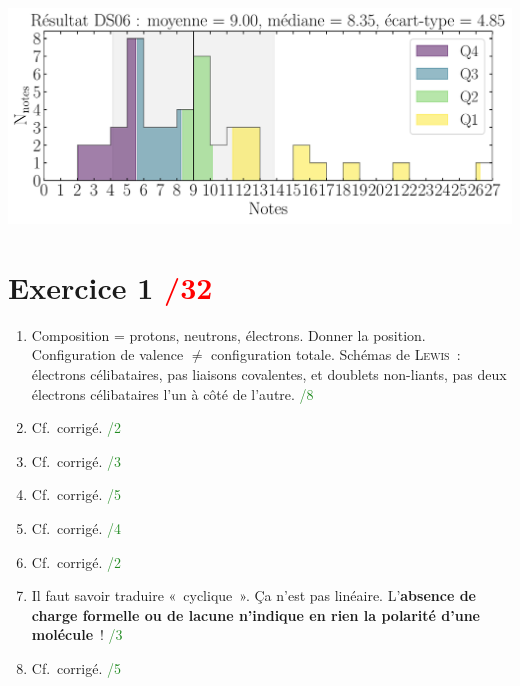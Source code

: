 \documentclass[a4paper, 10pt, final, garamond]{book}
\begin{document}
\begin{center}
    \includegraphics[width=.8\linewidth]{res_DS06.pdf}
\end{center}
\vspace*{-20pt}

\section{Exercice 1 \hfill \textcolor{red}{/32}}
\begin{enumerate}
    \item Composition = protons, neutrons, électrons. Donner la position.
        Configuration de valence $\neq$ configuration totale. Schémas de
        \textsc{Lewis}~: électrons célibataires, pas liaisons covalentes, et
        doublets non-liants, pas deux électrons célibataires l'un à côté de
        l'autre.
        \hfill \textcolor{ForestGreen}{/8}
    \item Cf.\ corrigé.
        \hfill \textcolor{ForestGreen}{/2}
    \item Cf.\ corrigé.
        \hfill \textcolor{ForestGreen}{/3}
    \item Cf.\ corrigé.
        \hfill \textcolor{ForestGreen}{/5}
    \item Cf.\ corrigé.
        \hfill \textcolor{ForestGreen}{/4}
    \item Cf.\ corrigé.
        \hfill \textcolor{ForestGreen}{/2}
    \item Il faut savoir traduire «~cyclique~». Ça n'est pas linéaire.
        L'\textbf{absence de charge formelle ou de lacune n'indique en rien la
        polarité d'une molécule}~!
        \hfill \textcolor{ForestGreen}{/3}
    \item Cf.\ corrigé.
        \hfill \textcolor{ForestGreen}{/5}
\end{enumerate}
\end{document}
